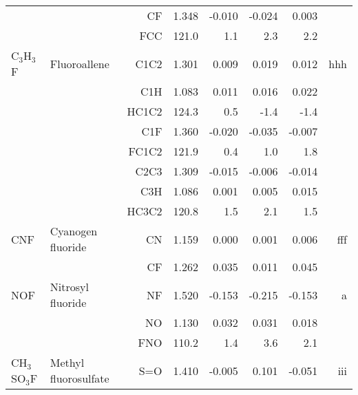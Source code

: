 \begin{table}
\begin{center}
\begin{tabular}{llrrrrrr}
             &                                    &CF            &     1.348   &    -0.010 &    -0.024 &     0.003 &       \\
             &                                    &FCC         &     121.0   &       1.1 &       2.3 &       2.2   &       \\
 C$_3$H$_3$F       & Fluoroallene                       &C1C2          &     1.301   &     0.009 &     0.019 &     0.012 &   hhh \\
             &                                    &C1H           &     1.083   &     0.011 &     0.016 &     0.022 &       \\
             &                                    &HC1C2       &     124.3   &       0.5 &      -1.4 &      -1.4   &       \\
             &                                    &C1F           &     1.360   &    -0.020 &    -0.035 &    -0.007 &       \\
             &                                    &FC1C2       &     121.9   &       0.4 &       1.0 &       1.8   &       \\
             &                                    &C2C3          &     1.309   &    -0.015 &    -0.006 &    -0.014 &       \\
             &                                    &C3H           &     1.086   &     0.001 &     0.005 &     0.015 &       \\
             &                                    &HC3C2       &     120.8   &       1.5 &       2.1 &       1.5   &       \\
 CNF         & Cyanogen fluoride                  &CN            &     1.159   &     0.000 &     0.001 &     0.006 &   fff \\
             &                                    &CF            &     1.262   &     0.035 &     0.011 &     0.045 &       \\
 NOF         & Nitrosyl fluoride                  &NF            &     1.520   &    -0.153 &    -0.215 &    -0.153 &     a \\
             &                                    &NO            &     1.130   &     0.032 &     0.031 &     0.018 &       \\
             &                                    &FNO         &     110.2   &       1.4 &       3.6 &       2.1   &       \\
 CH$_3$SO$_3$F     & Methyl fluorosulfate               &S=O           &     1.410   &    -0.005 &     0.101 &    -0.051 &   iii \\

\end{tabular}
\end{center}
\end{table}
